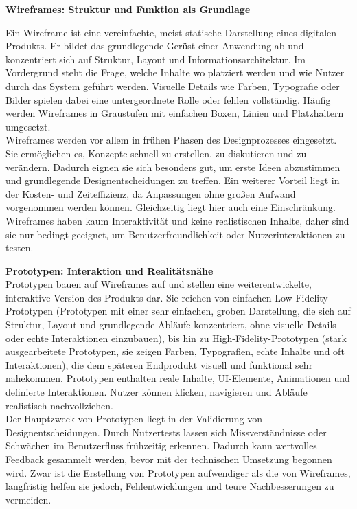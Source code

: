 \textbf{Wireframes: Struktur und Funktion als Grundlage}

Ein Wireframe ist eine vereinfachte, meist statische Darstellung eines digitalen Produkts. Er bildet das grundlegende 
Gerüst einer Anwendung ab und konzentriert sich auf Struktur, Layout und Informationsarchitektur. Im Vordergrund steht 
die Frage, welche Inhalte wo platziert werden und wie Nutzer durch das System geführt werden. Visuelle Details wie Farben, 
Typografie oder Bilder spielen dabei eine untergeordnete Rolle oder fehlen vollständig. Häufig werden Wireframes in 
Graustufen mit einfachen Boxen, Linien und Platzhaltern umgesetzt. \\

Wireframes werden vor allem in frühen Phasen des Designprozesses eingesetzt. Sie ermöglichen es, Konzepte schnell zu 
erstellen, zu diskutieren und zu verändern. Dadurch eignen sie sich besonders gut, um erste Ideen abzustimmen und grundlegende Designentscheidungen zu treffen. Ein weiterer Vorteil liegt in der Kosten- und Zeiteffizienz, 
da Anpassungen ohne großen Aufwand vorgenommen werden können. Gleichzeitig liegt hier auch eine Einschränkung. Wireframes haben
kaum Interaktivität und keine realistischen Inhalte, daher sind sie nur bedingt geeignet, um Benutzerfreundlichkeit oder 
Nutzerinteraktionen zu testen.\cite{popwebdesign_wire}\cite{justinmind_wireframe_prototyp_mockup}\cite{miro_wire}
\vspace{0.5em}

\textbf{Prototypen: Interaktion und Realitätsnähe} \\
Prototypen bauen auf Wireframes auf und stellen eine weiterentwickelte, interaktive Version des Produkts dar. 
Sie reichen von einfachen Low-Fidelity-Prototypen (Prototypen mit einer sehr einfachen, groben Darstellung, die sich auf Struktur, Layout und grundlegende Abläufe konzentriert, ohne visuelle Details oder echte Interaktionen einzubauen), bis hin zu High-Fidelity-Prototypen (stark ausgearbeitete Prototypen, sie zeigen Farben, Typografien, echte Inhalte und oft Interaktionen), die dem späteren Endprodukt 
visuell und funktional sehr nahekommen. Prototypen enthalten reale Inhalte, UI-Elemente, Animationen und definierte 
Interaktionen. Nutzer können klicken, navigieren und Abläufe realistisch nachvollziehen.\cite{popwebdesign_wire}\cite{justinmind_wireframe_prototyp_mockup}\cite{miro_wire}\cite{justinmindLowHigh_fidelity} \\

Der Hauptzweck von Prototypen liegt in der Validierung von Designentscheidungen. Durch Nutzertests 
lassen sich Missverständnisse oder Schwächen im Benutzerfluss frühzeitig erkennen. Dadurch kann wertvolles Feedback 
gesammelt werden, bevor mit der technischen Umsetzung begonnen wird. Zwar ist die Erstellung von Prototypen aufwendiger 
als die von Wireframes, langfristig helfen sie jedoch, Fehlentwicklungen und teure Nachbesserungen zu vermeiden.\cite{popwebdesign_wire}\cite{justinmind_wireframe_prototyp_mockup}\cite{miro_wire}\cite{justinmindLowHigh_fidelity} \\

